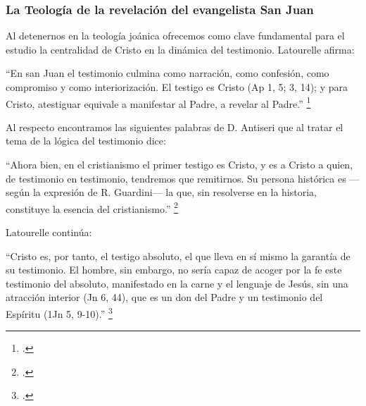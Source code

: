\documentclass[12pt]{article}
\begin{document}
{\subsubsection{La Teología de la revelación del evangelista San Juan}

Al detenernos en la teología joánica ofrecemos como clave fundamental para el estudio la centralidad de Cristo en la dinámica del testimonio. Latourelle afirma:

``En san Juan el testimonio culmina como narración, como confesión, como compromiso y como interiorización. El testigo es Cristo (Ap 1, 5; 3, 14); y para Cristo, atestiguar equivale a manifestar al Padre, a revelar al Padre.''
\footcite[1529]{dicctf}

Al respecto encontramos las siguientes palabras de D. Antiseri que al tratar el tema de la lógica del testimonio dice:

``Ahora bien, en el cristianismo el primer testigo es Cristo, y es a Cristo a quien, de testimonio en testimonio, tendremos que remitirnos. Su persona histórica es ---según la expresión de R. Guardini--- la que, sin resolverse en la historia, constituye la esencia del cristianismo.''
\footcite[168]{antiseri}

Latourelle continúa:

``Cristo es, por tanto, el testigo absoluto, el que lleva en sí mismo la garantía de su testimonio. El hombre, sin embargo, no sería capaz de acoger por la fe este testimonio del absoluto, manifestado en la carne y el lenguaje de Jesús, sin una atracción interior (Jn 6, 44), que es un don del Padre y un testimonio del Espíritu (1Jn 5, 9-10).''
\footcite[1530]{dicctf}

}
\end{document}
